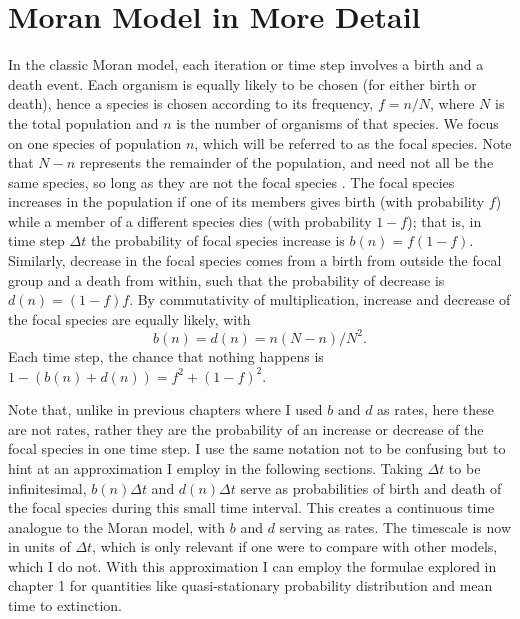\section{Moran Model in More Detail}
\fi
In the classic Moran model, each iteration or time step involves a birth and a death event.
Each organism is equally likely to be chosen (for either birth or death), hence a species is chosen according to its frequency, $f=n/N$, where $N$ is the total population and $n$ is the number of organisms of that species. 
We focus on one species of population $n$, which will be referred to as the focal species. 
Note that $N-n$ represents the remainder of the population, and need not all be the same species, so long as they are not the focal species \cite{Black2012}. %
The focal species increases in the population if one of its members gives birth (with probability $f$) while a member of a different species dies (with probability $1-f$); that is, in time step $\Delta t$ the probability of focal species increase is $b(n) = f(1-f)$. 
Similarly, decrease in the focal species comes from a birth from outside the focal group and a death from within, such that the probability of decrease is $d(n) = (1-f)f$. 
By commutativity of multiplication, increase and decrease of the focal species are equally likely, with
\begin{equation}
b(n) = d(n) = n(N-n)/N^2.
\end{equation}
Each time step, the chance that nothing happens is $1-\left(b(n)+d(n)\right) = f^2 + (1-f)^2$. 

Note that, unlike in previous chapters where I used $b$ and $d$ as rates, here these are not rates, rather they are the probability of an increase or decrease of the focal species in one time step. 
I use the same notation not to be confusing but to hint at an approximation I employ in the following sections. %
Taking $\Delta t$ to be infinitesimal, $b(n)\Delta t$ and $d(n)\Delta t$ serve as probabilities of birth and death of the focal species during this small time interval. 
This creates a continuous time analogue to the Moran model, with $b$ and $d$ serving as rates. 
The timescale is now in units of $\Delta t$, which is only relevant if one were to compare with other models, which I do not. 
With this approximation I can employ the formulae explored in chapter 1 for quantities like quasi-stationary probability distribution and mean time to extinction. 


